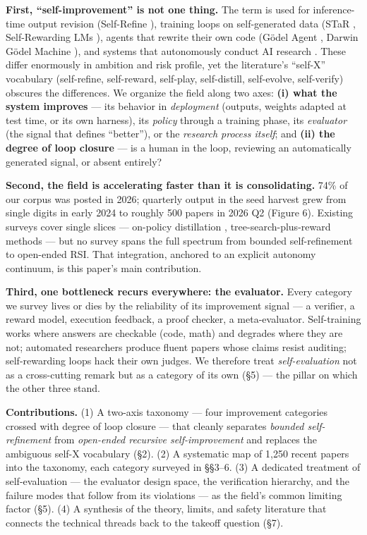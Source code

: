 \documentclass[
  11pt,
]{article}
\begin{document}
\textbf{First, ``self-improvement'' is not one thing.} The term is used
for inference-time output revision (Self-Refine
\citep{madaan2023selfrefine}), training loops on self-generated data
(STaR \citep{zelikman2022star}, Self-Rewarding LMs
\citep{yuan2024selfrewarding}), agents that rewrite their own code
(Gödel Agent \citep{yin2024g}, Darwin Gödel Machine
\citep{zhang2025dgm}), and systems that autonomously conduct AI research
\citep{lu2024aiscientist}. These differ enormously in ambition and risk
profile, yet the literature's ``self-X'' vocabulary (self-refine,
self-reward, self-play, self-distill, self-evolve, self-verify) obscures
the differences. We organize the field along two axes: \textbf{(i) what
the system improves} --- its behavior in \emph{deployment} (outputs,
weights adapted at test time, or its own harness), its \emph{policy}
through a training phase, its \emph{evaluator} (the signal that defines
``better''), or the \emph{research process itself}; and \textbf{(ii) the
degree of loop closure} --- is a human in the loop, reviewing an
automatically generated signal, or absent entirely?

\textbf{Second, the field is accelerating faster than it is
consolidating.} 74\% of our corpus was posted in 2026; quarterly output
in the seed harvest grew from single digits in early 2024 to roughly 500
papers in 2026 Q2 (Figure 6). Existing surveys cover single slices ---
on-policy distillation \citep{song2026survey}, tree-search-plus-reward
methods \citep{wei2025unifying} --- but no survey spans the full
spectrum from bounded self-refinement to open-ended RSI. That
integration, anchored to an explicit autonomy continuum, is this paper's
main contribution.

\textbf{Third, one bottleneck recurs everywhere: the evaluator.} Every
category we survey lives or dies by the reliability of its improvement
signal --- a verifier, a reward model, execution feedback, a proof
checker, a meta-evaluator. Self-training works where answers are
checkable (code, math) and degrades where they are not; automated
researchers produce fluent papers whose claims resist auditing;
self-rewarding loops hack their own judges. We therefore treat
\emph{self-evaluation} not as a cross-cutting remark but as a category
of its own (§5) --- the pillar on which the other three stand.

\textbf{Contributions.} (1) A two-axis taxonomy --- four improvement
categories crossed with degree of loop closure --- that cleanly
separates \emph{bounded self-refinement} from \emph{open-ended recursive
self-improvement} and replaces the ambiguous self-X vocabulary (§2). (2)
A systematic map of 1,250 recent papers into the taxonomy, each category
surveyed in §§3--6. (3) A dedicated treatment of self-evaluation --- the
evaluator design space, the verification hierarchy, and the failure
modes that follow from its violations --- as the field's common limiting
factor (§5). (4) A synthesis of the theory, limits, and safety
literature that connects the technical threads back to the takeoff
question (§7).
\end{document}
